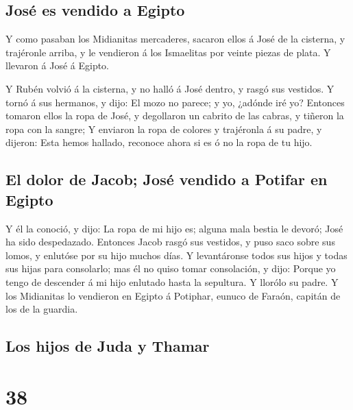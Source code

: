 \hypertarget{josuxe9-es-vendido-a-egipto}{%
\subsection{José es vendido a
Egipto}\label{josuxe9-es-vendido-a-egipto}}

 Y como pasaban los Midianitas mercaderes, sacaron ellos
á José de la cisterna, y trajéronle arriba, y le vendieron á los
Ismaelitas por veinte piezas de plata. Y llevaron á José á Egipto.

 Y Rubén volvió á la cisterna, y no halló á José dentro,
y rasgó sus vestidos.  Y tornó á sus hermanos, y dijo: El
mozo no parece; y yo, ¿adónde iré yo?  Entonces tomaron
ellos la ropa de José, y degollaron un cabrito de las cabras, y tiñeron
la ropa con la sangre;  Y enviaron la ropa de colores y
trajéronla á su padre, y dijeron: Esta hemos hallado, reconoce ahora si
es ó no la ropa de tu hijo.

\hypertarget{el-dolor-de-jacob-josuxe9-vendido-a-potifar-en-egipto}{%
\subsection{El dolor de Jacob; José vendido a Potifar en
Egipto}\label{el-dolor-de-jacob-josuxe9-vendido-a-potifar-en-egipto}}

 Y él la conoció, y dijo: La ropa de mi hijo es; alguna
mala bestia le devoró; José ha sido despedazado. 
Entonces Jacob rasgó sus vestidos, y puso saco sobre sus lomos, y
enlutóse por su hijo muchos días.  Y levantáronse todos
sus hijos y todas sus hijas para consolarlo; mas él no quiso tomar
consolación, y dijo: Porque yo tengo de descender á mi hijo enlutado
hasta la sepultura. Y llorólo su padre.  Y los Midianitas
lo vendieron en Egipto á Potiphar, eunuco de Faraón, capitán de los de
la guardia.

\hypertarget{los-hijos-de-juda-y-thamar}{%
\subsection{Los hijos de Juda y
Thamar}\label{los-hijos-de-juda-y-thamar}}

\hypertarget{section-01-38}{%
\section{38}\label{section-01-38}}

